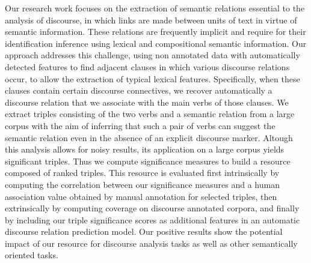 \documentclass[10pt, a4paper, twopage, headinclude, footinclude, BCOR5mm]{scrartcl}
\begin{document}
        \begin{table}[t!]
    \end{table}

\noindent
Our research work focuses on the extraction of semantic relations essential to the analysis of discourse, in which links are made between units of text in virtue of semantic information.  These relations are frequently implicit and require for their identification inference using lexical and compositional semantic information. Our approach addresses this challenge, using non annotated data with automatically detected features to find adjacent clauses in which various discourse relations occur, to allow the extraction of typical lexical features.  Specifically, when these clauses contain certain discourse connectives, we recover automatically a discourse relation that we associate with the main verbs of those clauses. We extract triples consisting of the two verbs and a semantic relation from a large corpus with the aim of inferring that such a pair of verbs can suggest the semantic relation even in the absence of an explicit discourse marker. Altough this analysis allows for noisy results, its application on a large corpus yields significant triples.   Thus we compute significance measures to build a resource composed of ranked triples.  This resource is evaluated first intrinsically by computing the correlation between our significance measures and a human association value obtained by manual annotation for selected triples, then extrinsically by computing coverage on discourse annotated corpora, and finally by including our triple significance scores as additional features in an automatic discourse relation prediction model.  Our positive results show the potential impact of our resource for discourse analysis tasks as well as other semantically oriented tasks.
\end{document}
